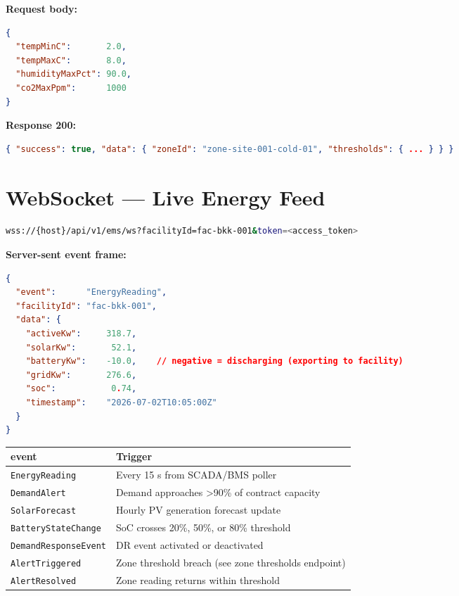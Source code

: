 \documentclass{article}
\begin{document}
\textbf{Request body:}
\begin{lstlisting}[language=json]
{
  "tempMinC":       2.0,
  "tempMaxC":       8.0,
  "humidityMaxPct": 90.0,
  "co2MaxPpm":      1000
}
\end{lstlisting}

\textbf{Response 200:}
\begin{lstlisting}[language=json]
{ "success": true, "data": { "zoneId": "zone-site-001-cold-01", "thresholds": { ... } } }
\end{lstlisting}

\newpage

\section{WebSocket --- Live Energy Feed}

\begin{lstlisting}[language=bash]
wss://{host}/api/v1/ems/ws?facilityId=fac-bkk-001&token=<access_token>
\end{lstlisting}

\textbf{Server-sent event frame:}
\begin{lstlisting}[language=json, caption=EMS live push event]
{
  "event":      "EnergyReading",
  "facilityId": "fac-bkk-001",
  "data": {
    "activeKw":     318.7,
    "solarKw":       52.1,
    "batteryKw":    -10.0,    // negative = discharging (exporting to facility)
    "gridKw":       276.6,
    "soc":           0.74,
    "timestamp":    "2026-07-02T10:05:00Z"
  }
}
\end{lstlisting}

\begin{center}
\begin{tabular}{ll}
\toprule
\textbf{event} & \textbf{Trigger}\\
\midrule
\texttt{EnergyReading}     & Every 15 s from SCADA/BMS poller\\
\texttt{DemandAlert}       & Demand approaches \textgreater 90\% of contract capacity\\
\texttt{SolarForecast}     & Hourly PV generation forecast update\\
\texttt{BatteryStateChange}& SoC crosses 20\%, 50\%, or 80\% threshold\\
\texttt{DemandResponseEvent}& DR event activated or deactivated\\
\texttt{AlertTriggered}    & Zone threshold breach (see zone thresholds endpoint)\\
\texttt{AlertResolved}     & Zone reading returns within threshold\\
\bottomrule
\end{tabular}
\end{center}
\end{document}
